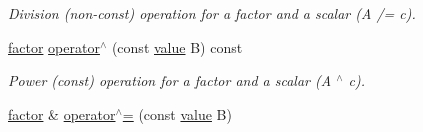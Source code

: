 \begin{DoxyCompactItemize}
\begin{DoxyCompactList}\small\item\em Division (non-\/const) operation for a factor and a scalar (A /= c). \end{DoxyCompactList}\item 
\hyperlink{classmerlin_1_1factor}{factor} \hyperlink{classmerlin_1_1factor_a715acf9c7d2b2e6dbd4943c83f6b578b}{operator$^\wedge$} (const \hyperlink{classmerlin_1_1factor_a1b14d19e509403448fbef26b003c9281}{value} B) const \hypertarget{classmerlin_1_1factor_a715acf9c7d2b2e6dbd4943c83f6b578b}{}\label{classmerlin_1_1factor_a715acf9c7d2b2e6dbd4943c83f6b578b}

\begin{DoxyCompactList}\small\item\em Power (const) operation for a factor and a scalar (A $^\wedge$ c). \end{DoxyCompactList}\item 
\hyperlink{classmerlin_1_1factor}{factor} \& \hyperlink{classmerlin_1_1factor_a821c21721c57926e82cb4d39c04865c6}{operator$^\wedge$=} (const \hyperlink{classmerlin_1_1factor_a1b14d19e509403448fbef26b003c9281}{value} B)\hypertarget{classmerlin_1_1factor_a821c21721c57926e82cb4d39c04865c6}{}\label{classmerlin_1_1factor_a821c21721c57926e82cb4d39c04865c6}


\end{DoxyCompactItemize}
